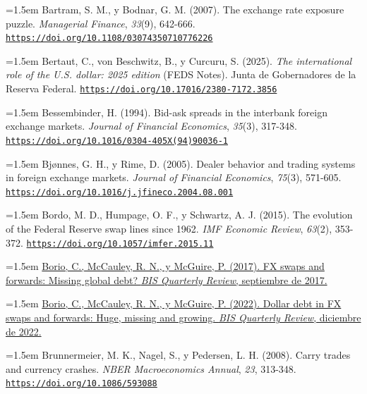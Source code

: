 \documentclass[10pt,a4paper]{article}
\begin{document}
\noindent\hangindent=1.5em Bartram, S. M., y Bodnar, G. M. (2007). The exchange rate exposure puzzle. \textit{Managerial Finance}, \textit{33}(9), 642-666. \href{https://doi.org/10.1108/03074350710776226}{\nolinkurl{https://doi.org/10.1108/03074350710776226}}

\noindent\hangindent=1.5em Bertaut, C., von Beschwitz, B., y Curcuru, S. (2025). \textit{The international role of the U.S. dollar: 2025 edition} (FEDS Notes). Junta de Gobernadores de la Reserva Federal. \href{https://doi.org/10.17016/2380-7172.3856}{\nolinkurl{https://doi.org/10.17016/2380-7172.3856}}

\noindent\hangindent=1.5em Bessembinder, H. (1994). Bid-ask spreads in the interbank foreign exchange markets. \textit{Journal of Financial Economics}, \textit{35}(3), 317-348. \href{https://doi.org/10.1016/0304-405X(94)90036-1}{\nolinkurl{https://doi.org/10.1016/0304-405X(94)90036-1}}

\noindent\hangindent=1.5em Bjønnes, G. H., y Rime, D. (2005). Dealer behavior and trading systems in foreign exchange markets. \textit{Journal of Financial Economics}, \textit{75}(3), 571-605. \href{https://doi.org/10.1016/j.jfineco.2004.08.001}{\nolinkurl{https://doi.org/10.1016/j.jfineco.2004.08.001}}

\noindent\hangindent=1.5em Bordo, M. D., Humpage, O. F., y Schwartz, A. J. (2015). The evolution of the Federal Reserve swap lines since 1962. \textit{IMF Economic Review}, \textit{63}(2), 353-372. \href{https://doi.org/10.1057/imfer.2015.11}{\nolinkurl{https://doi.org/10.1057/imfer.2015.11}}

\noindent\hangindent=1.5em \href{https://www.bis.org/publ/qtrpdf/r_qt1709e.htm}{Borio, C., McCauley, R. N., y McGuire, P. (2017). FX swaps and forwards: Missing global debt? \textit{BIS Quarterly Review}, septiembre de 2017.}

\noindent\hangindent=1.5em \href{https://www.bis.org/publ/qtrpdf/r_qt2212h.htm}{Borio, C., McCauley, R. N., y McGuire, P. (2022). Dollar debt in FX swaps and forwards: Huge, missing and growing. \textit{BIS Quarterly Review}, diciembre de 2022.}

\noindent\hangindent=1.5em Brunnermeier, M. K., Nagel, S., y Pedersen, L. H. (2008). Carry trades and currency crashes. \textit{NBER Macroeconomics Annual}, \textit{23}, 313-348. \href{https://doi.org/10.1086/593088}{\nolinkurl{https://doi.org/10.1086/593088}}
\end{document}
